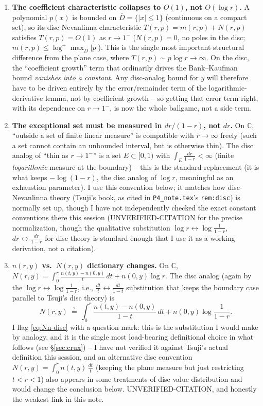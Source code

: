 \documentclass[11pt]{article}
\theoremstyle{remark}
\newcommand{\C}{\mathbb C}
\begin{document}
\begin{enumerate}
\item \textbf{The coefficient characteristic collapses to $O(1)$, not $O(\log r)$.} A polynomial
$p(x)$ is bounded on $\overline D=\{|x|\le1\}$ (continuous on a compact set), so its disc
Nevanlinna characteristic $T(r,p)=m(r,p)+N(r,p)$ satisfies $T(r,p)=O(1)$ as $r\to1^-$ ($N(r,p)=0$,
no poles in the disc; $m(r,p)\le\log^+\max_{\overline D}|p|$). This is the single most important
structural difference from the plane case, where $T(r,p)\sim p\log r\to\infty$. On the disc, the
``coefficient growth'' term that ordinarily drives the Bank--Kaufman bound \emph{vanishes into a
constant}. Any disc-analog bound for $y$ will therefore have to be driven entirely by the
error/remainder term of the logarithmic-derivative lemma, not by coefficient growth -- so getting
that error term right, with its dependence on $r\to1^-$, is now the whole ballgame, not a side
term.

\item \textbf{The exceptional set must be measured in $dr/(1-r)$, not $dr$.} On $\C$, ``outside a
set of finite linear measure'' is compatible with $r\to\infty$ freely (such a set cannot contain
an unbounded interval, but is otherwise thin). The disc analog of ``thin as $r\to1^-$'' is a set
$E\subset[0,1)$ with $\int_E\frac{dr}{1-r}<\infty$ (finite \emph{logarithmic} measure at the
boundary) -- this is the standard replacement (it is what keeps $-\log(1-r)$, the disc analog of
$\log r$, meaningful as an exhaustion parameter). I use this convention below; it matches how
disc-Nevanlinna theory (Tsuji's book, as cited in \texttt{P4\_note.tex}'s \texttt{rem:disc}) is
normally set up, though I have not independently checked the exact constant conventions there this
session (UNVERIFIED-CITATION for the precise normalization, though the qualitative substitution
$\log r\leftrightarrow\log\frac1{1-r}$, $dr\leftrightarrow\frac{dr}{1-r}$ for disc theory is
standard enough that I use it as a working derivation, not a citation).

\item \textbf{$n(r,y)$ vs.\ $N(r,y)$ dictionary changes.} On $\C$, $N(r,y)=\int_0^r
\frac{n(t,y)-n(0,y)}{t}\,dt+n(0,y)\log r$. The disc analog (again by the
$\log r\leftrightarrow\log\frac1{1-r}$, i.e., $\frac{dt}t\leftrightarrow\frac{dt}{1-t}$
substitution that keeps the boundary case parallel to Tsuji's disc theory) is
\begin{equation}\label{eq:Nn-disc}
N(r,y)\ \overset{?}{=}\ \int_0^r\frac{n(t,y)-n(0,y)}{1-t}\,dt+n(0,y)\log\frac1{1-r}.
\end{equation}
I flag \eqref{eq:Nn-disc} with a question mark: this is the substitution I would make by analogy,
and it is the single most load-bearing definitional choice in what follows (see
\S\ref{sec:crux}) -- I have not verified it against Tsuji's actual definition this session, and an
alternative disc convention $N(r,y)=\int_0^r n(t,y)\,\frac{dt}t$ (keeping the plane measure but
just restricting $t<r<1$) also appears in some treatments of disc value distribution and would
change the conclusion below. UNVERIFIED-CITATION, and honestly the weakest link in this note.
\end{enumerate}
\end{document}
